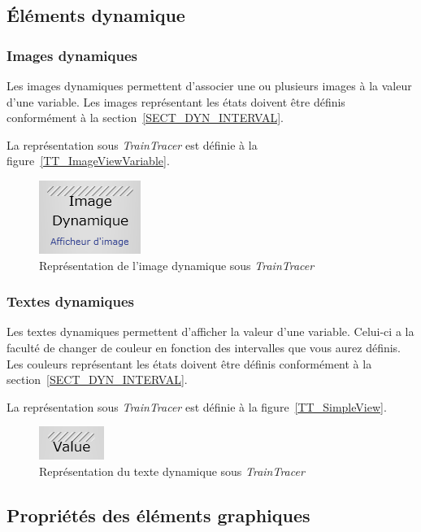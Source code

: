 \documentclass{AlstomLibrary}
\newcommand{\progname}[1]{\textit{#1}}
\newcommand{\TT}{{\progname{TrainTracer}} }
\begin{document}
\subsection{Éléments dynamique}

\subsubsection{Images dynamiques}

Les images dynamiques permettent d'associer une ou plusieurs images à la valeur d'une variable. Les images représentant les états doivent être définis conformément à la section~\vref{SECT_DYN_INTERVAL}.

La représentation sous \TT est définie à la figure~\vref{TT_ImageViewVariable}.

\begin{figure}\centering
\includegraphics[scale=1]{TT_ImageViewVariable.png}
\caption{Représentation de l'image dynamique sous \TT}\label{TT_ImageViewVariable}
\end{figure}

\subsubsection{Textes dynamiques}

Les textes dynamiques permettent d'afficher la valeur d'une variable. Celui-ci a la faculté de changer de couleur en fonction des intervalles que vous aurez définis. Les couleurs représentant les états doivent être définis conformément à la section~\vref{SECT_DYN_INTERVAL}.

La représentation sous \TT est définie à la figure~\vref{TT_SimpleView}.

\begin{figure}\centering
\includegraphics[scale=1]{TT_SimpleView.png}
\caption{Représentation du texte dynamique sous \TT}\label{TT_SimpleView}
\end{figure}

\subsection{Propriétés des éléments graphiques}
\end{document}
